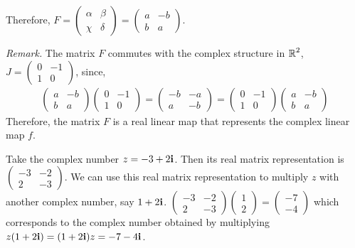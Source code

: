 \noindent Therefore, $F = \begin{pmatrix} \alpha & \beta \\ \chi & \delta \end{pmatrix} = \begin{pmatrix} \label{phismall} a & -b \\ b & a \end{pmatrix}$. 

\noindent\textit{Remark.} The matrix $F$ commutes with the complex structure in $\operatorname{\mathbb{R}}^2$, $J = 
\begin{pmatrix}
 		0 & -1 \\
 		1 & 0
 \end{pmatrix}$, since, 
 \begin{align*}
	\begin{pmatrix}
	 	a & -b \\
	 	b & a
	 \end{pmatrix}
	\begin{pmatrix}
	 		0 & -1 \\
	 		1 & 0
	 \end{pmatrix} = 
	 \begin{pmatrix}
	 	-b & -a \\
	 	a & -b
	 \end{pmatrix} =
	 \begin{pmatrix}
	 		0 & -1 \\
	 		1 & 0
	 \end{pmatrix}
	 \begin{pmatrix}
	 	a & -b \\
	 	b & a
	 \end{pmatrix}
\end{align*}
Therefore, the matrix $F$ is a real linear map that represents the complex linear map $f$.

\begin{ex}
	Take the complex number $z = -3+2\textbf{i}$. Then its real matrix representation is
	$\begin{pmatrix}
		-3 & -2 \\
		2 & -3
	\end{pmatrix}$. 
	We can use this real matrix representation to multiply $z$ with another complex number, say $1+2\textbf{i}$. 
	$\begin{pmatrix}
		-3 & -2 \\
		2 & -3
	\end{pmatrix}
	\begin{pmatrix}
		1 \\ 2
	\end{pmatrix}
	 = 
	\begin{pmatrix}
		-7 \\
		-4
	\end{pmatrix}$
	which corresponds to the complex number obtained by multiplying $z(1+2\textbf{i}) = (1+2\textbf{i})z = -7-4\textbf{i}$.
\end{ex}

